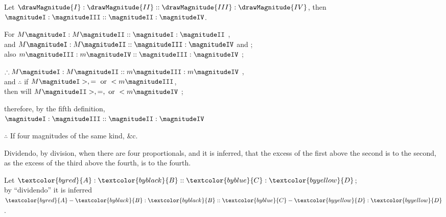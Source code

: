 \documentclass[booklanguage=english]{byrnebook}
\begin{document}
\vfill\pagebreak


\begin{center}
Let $\drawMagnitude{I} : \drawMagnitude{II} :: \drawMagnitude{III} : \drawMagnitude{IV}$, then $\magnitudeI : \magnitudeIII :: \magnitudeII : \magnitudeIV$.

For $M \magnitudeI : M \magnitudeII :: \magnitudeI : \magnitudeII$ ,\\
and $M \magnitudeI : M \magnitudeII :: \magnitudeIII : \magnitudeIV$ \byref{\hypref} and ;\\
also $m \magnitudeIII : m \magnitudeIV :: \magnitudeIII : \magnitudeIV$ ;

$\therefore M \magnitudeI : M \magnitudeII :: m \magnitudeIII : m \magnitudeIV$ ,\\
and $\therefore$ if $M \magnitudeI >, = \mbox { or } < m \magnitudeIII$,\\
then will $M \magnitudeII >, =, \mbox{ or } < m \magnitudeIV$ ;

therefore, by the fifth definition,\\
 $\magnitudeI : \magnitudeIII :: \magnitudeII : \magnitudeIV$

 $\therefore$ If four magnitudes of the same kind, \&c.
\end{center}

\def\varA{\textcolor{byred}{A}}
\def\varB{\textcolor{byblack}{B}}
\def\varC{\textcolor{byblue}{C}}
\def\varD{\textcolor{byyellow}{D}}
Dividendo, by division, when there are four proportionals, and it is inferred, that the excess of the first above the second is to the second, as the excess of the third above the fourth, is to the fourth.

\begin{center}
Let $\varA : \varB :: \varC : \varD$;\\
by \enquote{dividendo} it is inferred\\
$\varA - \varB : \varB :: \varC - \varD : \varD$. %
\end{center}
\end{document}
